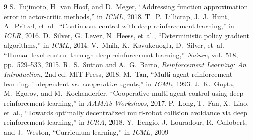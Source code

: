 \documentclass[11pt,a4paper]{article}
\begin{document}
\begin{thebibliography}{9}
 S.~Fujimoto, H.~van Hoof, and D.~Meger,
``Addressing function approximation error in actor-critic methods,'' in
\emph{ICML}, 2018.
 T.~P.~Lillicrap, J.~J.~Hunt, A.~Pritzel, et~al.,
``Continuous control with deep reinforcement learning,'' in \emph{ICLR}, 2016.
 D.~Silver, G.~Lever, N.~Heess, et~al.,
``Deterministic policy gradient algorithms,'' in \emph{ICML}, 2014.
 V.~Mnih, K.~Kavukcuoglu, D.~Silver, et~al.,
``Human-level control through deep reinforcement learning,''
\emph{Nature}, vol.~518, pp.~529--533, 2015.
 R.~S.~Sutton and A.~G.~Barto,
\emph{Reinforcement Learning: An Introduction}, 2nd ed. MIT Press, 2018.
 M.~Tan,
``Multi-agent reinforcement learning: independent vs.\ cooperative agents,''
in \emph{ICML}, 1993.
 J.~K.~Gupta, M.~Egorov, and M.~Kochenderfer,
``Cooperative multi-agent control using deep reinforcement learning,'' in
\emph{AAMAS Workshops}, 2017.
 P.~Long, T.~Fan, X.~Liao, et~al.,
``Towards optimally decentralized multi-robot collision avoidance via deep
reinforcement learning,'' in \emph{ICRA}, 2018.
 Y.~Bengio, J.~Louradour, R.~Collobert, and J.~Weston,
``Curriculum learning,'' in \emph{ICML}, 2009.
\end{thebibliography}
\end{document}
